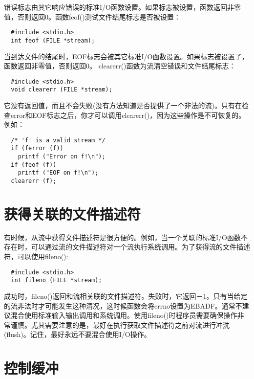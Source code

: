 错误标志由其它响应错误的标准I/O函数设置。如果标志被设置，函数返回非零值，否则返回0。函数feof()测试文件结尾标志是否被设置：
\begin{lstlisting}
  #include <stdio.h>
  int feof (FILE *stream);
\end{lstlisting}

当到达文件的结尾时，EOF标志会被其它标准I/O函数设置。如果标志被设置了，函数返回非零值，否则返回0。 clearerr()函数为流清空错误和文件结尾标志：
\begin{lstlisting}
  #include <stdio.h>
  void clearerr (FILE *stream);
\end{lstlisting}

它没有返回值，而且不会失败(没有方法知道是否提供了一个非法的流)。只有在检查error和EOF标志之后，你才可以调用clearerr()，因为这些操作是不可恢复的。例如：
\begin{lstlisting}
  /* 'f' is a valid stream */
  if (ferror (f))
    printf ("Error on f!\n"); 
  if (feof (f))
    printf ("EOF on f!\n");
  clearerr (f);
\end{lstlisting}


\section{获得关联的文件描述符}

有时候，从流中获得文件描述符是很方便的。例如，当一个关联的标准I/O函数不存在时，可以通过流的文件描述符对一个流执行系统调用。为了获得流的文件描述符，可以使用fileno():
\begin{lstlisting}
  #include <stdio.h>
  int fileno (FILE *stream);
\end{lstlisting}

成功时，fileno()返回和流相关联的文件描述符。失败时，它返回－1。只有当给定的流非法时才可能发生这种清况，这时候函数会将errno设置为EBADF。通常不建议混合使用标准输入输出调用和系统调用。使用fileno()时程序员需要确保操作非常谨慎。尤其需要注意的是，最好在执行获取文件描述符之前对流进行冲洗(flush)。记住，最好永远不要混合使用I/O操作。

\section{控制缓冲}

